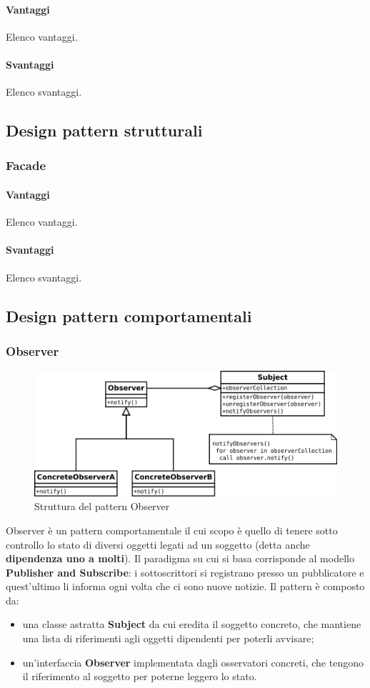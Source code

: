 \documentclass[../SpecificaTecnica.tex]{subfiles}
\begin{document}
			\paragraph{Vantaggi}
				Elenco vantaggi.
			\paragraph{Svantaggi}
				Elenco svantaggi.
	\subsection{Design pattern strutturali}
		\subsubsection{Facade}
		
			\paragraph{Vantaggi}
				Elenco vantaggi.
			\paragraph{Svantaggi}
				Elenco svantaggi.
	\subsection{Design pattern comportamentali}
		\subsubsection{Observer}
			\begin{figure}[!h]
				\centering
				\includegraphics[scale=0.7]{pattern/observer}
				\caption{Struttura del pattern Observer}
				\label{fig:Struttura_Observer}
			\end{figure}
			Observer è un pattern comportamentale il cui scopo è quello di tenere sotto controllo lo stato di diversi oggetti legati ad un soggetto (detta anche \textbf{dipendenza uno a molti}). Il paradigma su cui si basa corrisponde al modello \textbf{Publisher and Subscribe}: i sottoscrittori si registrano presso un pubblicatore e quest'ultimo li informa ogni volta che ci sono nuove notizie. Il pattern è composto da:
				\begin{itemize}
					\item una classe astratta \textbf{Subject} da cui eredita il soggetto concreto, che mantiene una lista di riferimenti agli oggetti dipendenti per poterli avvisare;
					\item un'interfaccia \textbf{Observer} implementata dagli osservatori concreti, che tengono il riferimento al soggetto per poterne leggero lo stato.
				\end{itemize}
\end{document}
